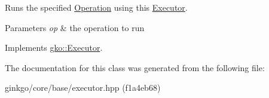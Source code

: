 Runs the specified \hyperlink{classgko_1_1Operation}{Operation} using this \hyperlink{classgko_1_1Executor}{Executor}. 


\begin{DoxyParams}{Parameters}
{\em op} & the operation to run \\
\hline
\end{DoxyParams}


Implements \hyperlink{classgko_1_1Executor_a1de8e2668b76e66690acf5eef9e8324d}{gko\+::\+Executor}.



The documentation for this class was generated from the following file\+:\begin{DoxyCompactItemize}
\item 
ginkgo/core/base/executor.\+hpp (f1a4eb68)\end{DoxyCompactItemize}
